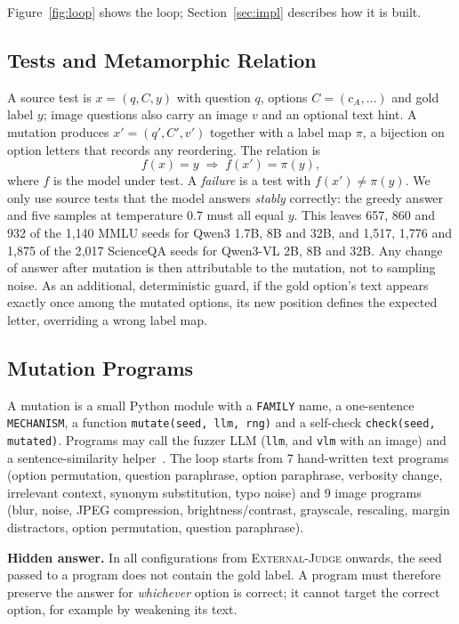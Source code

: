 \documentclass[sigconf]{acmart}
\newcommand{\OJ}{\textsc{External-Judge}}
\begin{document}
Figure~\ref{fig:loop} shows the loop; Section~\ref{sec:impl} describes how it is built.

\subsection{Tests and Metamorphic Relation}

A source test is $x=(q,C,y)$ with question $q$, options $C=(c_A,\dots)$ and gold label $y$; image questions also carry
an image $v$ and an optional text hint. A mutation produces $x'=(q',C',v')$ together with a label map $\pi$, a
bijection on option letters that records any reordering. The relation is
\[
  f(x)=y \;\Longrightarrow\; f(x')=\pi(y),
\]
where $f$ is the model under test. A \emph{failure} is a test with $f(x')\neq\pi(y)$. We only use source tests that
the model answers \emph{stably} correctly: the greedy answer and five samples at temperature 0.7 must all equal $y$.
This leaves 657, 860 and 932 of the 1{,}140 MMLU seeds for Qwen3 1.7B, 8B and 32B, and 1{,}517, 1{,}776 and 1{,}875 of
the 2{,}017 ScienceQA seeds for Qwen3-VL 2B, 8B and 32B. Any change of answer after mutation is then attributable to
the mutation, not to sampling noise. As an additional, deterministic guard, if the gold option's text appears exactly
once among the mutated options, its new position defines the expected letter, overriding a wrong label map.

\subsection{Mutation Programs}

A mutation is a small Python module with a \texttt{FAMILY} name, a one-sentence \texttt{MECHANISM}, a function
\texttt{mutate(seed, llm, rng)} and a self-check \texttt{check(seed, mutated)}. Programs may call the fuzzer LLM
(\texttt{llm}, and \texttt{vlm} with an image) and a sentence-similarity helper~\cite{reimers2019sbert}. The loop
starts from 7 hand-written text programs (option permutation, question paraphrase, option paraphrase, verbosity
change, irrelevant context, synonym substitution, typo noise) and 9 image programs (blur, noise, JPEG compression,
brightness/contrast, grayscale, rescaling, margin distractors, option permutation, question paraphrase).

\textbf{Hidden answer.} In all configurations from \OJ{} onwards, the seed passed to a program does not contain the
gold label. A program must therefore preserve the answer for \emph{whichever} option is correct; it cannot target the
correct option, for example by weakening its text.
\end{document}
